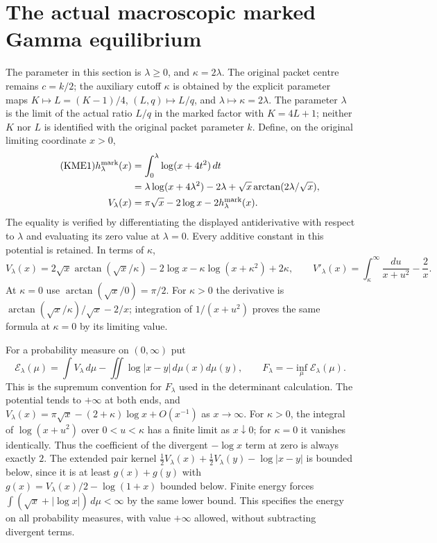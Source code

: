 \section{The actual macroscopic marked Gamma equilibrium}
\label{sec:macroscopic-marked-equilibrium}

The parameter in this section is $\lambda\geq0$, and $\kappa=2\lambda$.
The original packet centre remains $c=k/2$; the auxiliary cutoff
$\kappa$ is obtained by the explicit parameter maps
$K\mapsto L=(K-1)/4$, $(L,q)\mapsto L/q$, and
$\lambda\mapsto\kappa=2\lambda$.
The parameter $\lambda$ is the limit of the actual ratio $L/q$ in the marked factor with
$K=4L+1$; neither $K$ nor $L$ is identified with the original packet
parameter $k$.  Define, on the original limiting coordinate $x>0$,
\begin{align}\tag{KME1}
 h_\lambda^{\rm mark}(x)
 &=\int_0^\lambda\log(x+4t^2)\,dt\\
 &=\lambda\log(x+4\lambda^2)-2\lambda
          +\sqrt x\arctan(2\lambda/\sqrt x),\notag\\
 V_\lambda(x)&=\pi\sqrt x-2\log x-2h_\lambda^{\rm mark}(x).
 \notag
\end{align}
The equality is verified by differentiating the displayed antiderivative
with respect to $\lambda$ and evaluating its zero value at $\lambda=0$.
Every additive constant in this potential is retained.  In terms of $\kappa$,
\begin{equation}\tag{KME2}
 V_\lambda(x)
 =2\sqrt x\arctan(\sqrt x/\kappa)-2\log x
                  -\kappa\log(x+\kappa^2)+2\kappa,
 \qquad
 V'_\lambda(x)=\int_\kappa^\infty\frac{du}{x+u^2}-\frac2x.
\end{equation}
At $\kappa=0$ use $\arctan(\sqrt x/0)=\pi/2$.
For $\kappa>0$ the derivative is
$\arctan(\sqrt x/\kappa)/\sqrt x-2/x$; integration of
$1/(x+u^2)$ proves the same formula at $\kappa=0$ by its limiting value.

For a probability measure on $(0,\infty)$ put
\begin{equation}\tag{KME3}
 \mathcal E_\lambda(\mu)=\int V_\lambda\,d\mu
        -\iint\log|x-y|\,d\mu(x)d\mu(y),\qquad
 F_\lambda=-\inf_\mu\mathcal E_\lambda(\mu).
\end{equation}
This is the supremum convention for $F_\lambda$ used in the determinant
calculation. The potential tends to $+\infty$ at both ends, and
$V_\lambda(x)=\pi\sqrt x-(2+\kappa)\log x+O(x^{-1})$ as $x\to\infty$.
For $\kappa>0$, the integral of $\log(x+u^2)$ over $0<u<\kappa$ has a finite
limit as $x\downarrow0$; for $\kappa=0$ it vanishes identically. Thus the
coefficient of the divergent $-\log x$ term at zero is always exactly $2$.
The extended pair kernel
$\tfrac12V_\lambda(x)+\tfrac12V_\lambda(y)-\log|x-y|$
is bounded below, since it is at least $g(x)+g(y)$ with
$g(x)=V_\lambda(x)/2-\log(1+x)$ bounded below.
Finite energy forces $\int(\sqrt x+|\log x|)\,d\mu<\infty$ by the
same lower bound.  This specifies the energy on all probability measures,
with value $+\infty$ allowed, without subtracting divergent terms.

